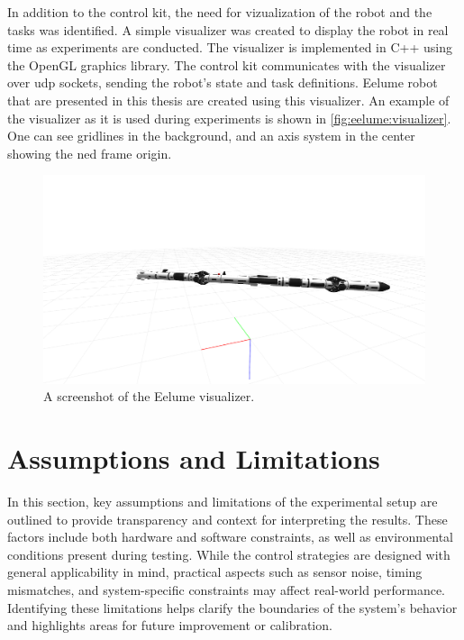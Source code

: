 In addition to the control kit, the need for vizualization of the robot and
the tasks was identified. A simple visualizer was created to display the robot
in real time as experiments are conducted. The visualizer is implemented in
C++ using the OpenGL graphics library. The control kit communicates with the
visualizer over \gls{udp} sockets, sending the robot's state and task definitions.
Eelume robot that are presented in this thesis are created using this visualizer.
An example of the visualizer as it is used during experiments is shown in
\autoref{fig:eelume:visualizer}. One can see gridlines in the background, and
an axis system in the center showing the \gls{ned} frame origin.
\begin{figure}[h!]
    \centering
    \includegraphics[width=\textwidth]{assets/eely-visualizer.png}
    \caption{A screenshot of the Eelume visualizer.}
    \label{fig:eelume:visualizer}
\end{figure}

\section{Assumptions and Limitations}
In this section, key assumptions and limitations of the experimental setup are 
outlined to provide transparency and context for interpreting the results. 
These factors include both hardware and software constraints, as well as 
environmental conditions present during testing. While the control strategies 
are designed with general applicability in mind, practical aspects such as 
sensor noise, timing mismatches, and system-specific constraints may affect 
real-world performance. Identifying these limitations helps clarify the 
boundaries of the system's behavior and highlights areas for future 
improvement or calibration.

